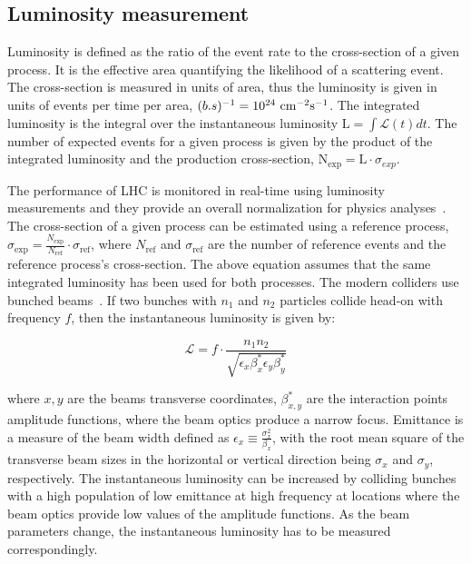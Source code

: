 \subsection{Luminosity measurement}

Luminosity is defined as the ratio of the event rate to the cross-section of a given process. It is the effective area quantifying the likelihood of a scattering event. The cross-section is measured in units of area, thus the luminosity is given in units of events per time per area, $(b.s)^{-1} = 10^{24}~\text{cm}^{-2}\text{s}^{-1}$. The integrated luminosity is the integral over the instantaneous luminosity $\text{L}=\int \mathcal{L}(t) dt$. The number of expected events for a given process is given by the product of the integrated luminosity and the production cross-section, $\mathrm{N_{exp}}=\text{L} \cdot \sigma_{exp}$.

The performance of LHC is monitored in real-time using luminosity measurements and they provide an overall normalization for physics analyses~\cite{Bayatian:2006nff}. The cross-section of a given process can be estimated using a reference process, $\sigma_{\exp} = \frac{N_{\exp}}{N_{\text{ref}}} \cdot \sigma_{\text{ref}}$, where $N_{\text{ref}}$ and $\sigma_{\text{ref}}$ are the number of reference events and the reference process's cross-section. The above equation assumes that the same integrated luminosity has been used for both processes. The modern colliders use bunched beams~\cite{Tanabashi:2018oca}. If two bunches with $n_1$ and $n_2$ particles collide head-on with frequency $f$, then the instantaneous luminosity is given by:

\begin{equation}
  \mathcal{L}=f \cdot \frac{n_{1} n_{2}}{\sqrt{\epsilon_{x} \beta_{x}^{*} \epsilon_{y} \beta_{y}^{*}}}
\end{equation}

where ${x,y}$ are the beams transverse coordinates, $\beta^*_{x,y}$ are the interaction points amplitude functions, where the beam optics produce a narrow focus. Emittance is a measure of the beam width defined as $\epsilon_{x} \equiv \frac{\sigma_{x}^{2}}{\beta_{x}}$, with the root mean square of the transverse beam sizes in the horizontal or vertical direction being $\sigma_{x}$ and $\sigma_{y}$, respectively. The instantaneous luminosity can be increased by colliding bunches with a high population of low emittance at high frequency at locations where the beam optics provide low values of the amplitude functions. As the beam parameters change, the instantaneous luminosity has to be measured correspondingly.

